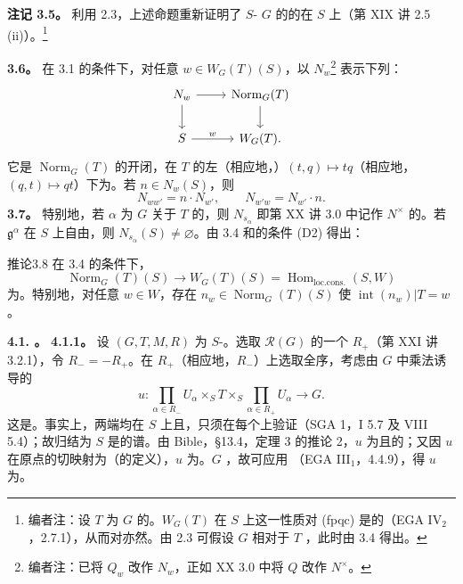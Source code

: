\textbf{注记 3.5。} 利用 2.3，上述命题重新证明了 $S$- $G$ 的的在 $S$ 上（第 XIX 讲 2.5 (ii)）。\footnote{编者注：设 $T$ 为 $G$ 的。$W_G(T)$ 在 $S$ 上这一性质对 (fpqc) 是的（EGA IV$_2$，2.7.1），从而对亦然。由 2.3 可假设 $G$ 相对于 $T$ ，此时由 3.4 得出。}

\textbf{3.6。} 在 3.1 的条件下，对任意 $w\in W_G(T)(S)$，以 $N_w$\footnote{编者注：已将 $Q_w$ 改作 $N_w$，正如 XX 3.0 中将 $Q$ 改作 $N^\times$。} 表示下列：
\[\begin{tikzcd}N_w\arrow[r]\arrow[d]&\operatorname{Norm}_G(T)\arrow[d]\\S\arrow[r,"w"]&W_G(T).\end{tikzcd}\]
它是 $\operatorname{Norm}_G(T)$ 的开闭，在 $T$ 的左（相应地，）$(t,q)\mapsto tq$（相应地，$(q,t)\mapsto qt$）下为。若 $n\in N_w(S)$，则
\[N_{ww'}=n\cdot N_{w'},\qquad N_{w'w}=N_{w'}\cdot n.\]
\textbf{3.7。} 特别地，若 $\alpha$ 为 $G$ 关于 $T$ 的，则 $N_{s_\alpha}$ 即第 XX 讲 3.0 中记作 $N^\times$ 的。若 $\mathfrak g^\alpha$ 在 $S$ 上自由，则 $N_{s_\alpha}(S)\ne\varnothing$。由 3.4 和的条件 (D2) 得出：
\begin{SGAresult}{推论}{3.8} 在 3.4 的条件下，
\[\operatorname{Norm}_G(T)(S)\longrightarrow W_G(T)(S)=\operatorname{Hom}_{\mathrm{loc.cons.}}(S,W)\]
为。特别地，对任意 $w\in W$，存在 $n_w\in\operatorname{Norm}_G(T)(S)$ 使 $\operatorname{int}(n_w)|T=w$。\end{SGAresult}
\textbf{4.1. 。}
\textbf{4.1.1。} 设 $(G,T,M,R)$ 为 $S$-。选取 $\mathcal R(G)$ 的一个 $R_+$（第 XXI 讲 3.2.1），令 $R_-=-R_+$。在 $R_+$（相应地，$R_-$）上选取全序，考虑由 $G$ 中乘法诱导的
\[u:\prod_{\alpha\in R_-}U_\alpha\mathbin{\times_S}T\mathbin{\times_S}\prod_{\alpha\in R_+}U_\alpha\longrightarrow G.\]
这是。事实上，两端均在 $S$ 上且，只须在每个上验证（SGA 1，I 5.7 及 VIII 5.4）；故归结为 $S$ 是的谱。由 Bible，§13.4，定理 3 的推论 2，$u$ 为且的；又因 $u$ 在原点的切映射为（的定义），$u$ 为。$G$ ，故可应用 （EGA III$_1$，4.4.9），得 $u$ 为。
